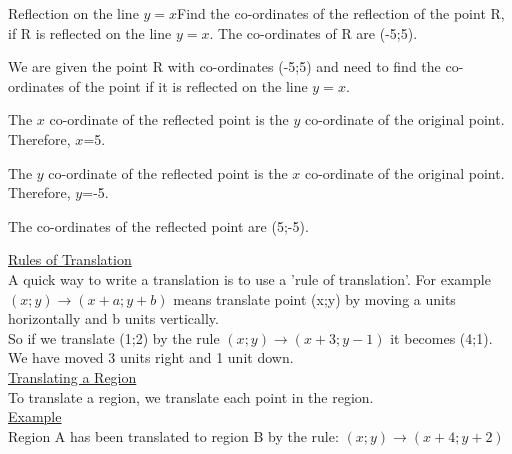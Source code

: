 \documentclass[10pt,a4paper,titlepage,twoside,openright]{report}
\begin{document}

\begin{wex}{Reflection on the line $y=x$}{Find the co-ordinates of the reflection of the point R, if R is reflected on the line $y=x$. The co-ordinates of R are (-5;5).}{
We are given the point R with co-ordinates (-5;5) and need to find the co-ordinates of the point if it is reflected on the line $y=x$.

The $x$ co-ordinate of the reflected point is the $y$ co-ordinate of the original point. Therefore, $x$=5.

The $y$ co-ordinate of the reflected point is the $x$ co-ordinate of the original point. Therefore, $y$=-5.

The co-ordinates of the reflected point are (5;-5).}
\end{wex}
\underline{Rules of Translation}\\
A quick way to write a translation is to use a 'rule of translation'. For example $(x;y)\rightarrow (x+a; y+b)$ means translate point (x;y) by moving a units horizontally and b units vertically.\\
So if we translate (1;2) by the rule $(x;y)\rightarrow (x+3; y-1)$ it becomes (4;1). We have moved 3 units right and 1 unit down.\\
\underline{Translating a Region}\\
To translate a region, we translate each point in the region.\\
\underline{Example}\\
Region A has been translated to region B by the rule: $(x;y)\rightarrow (x+4; y+2)$
\end{document}
